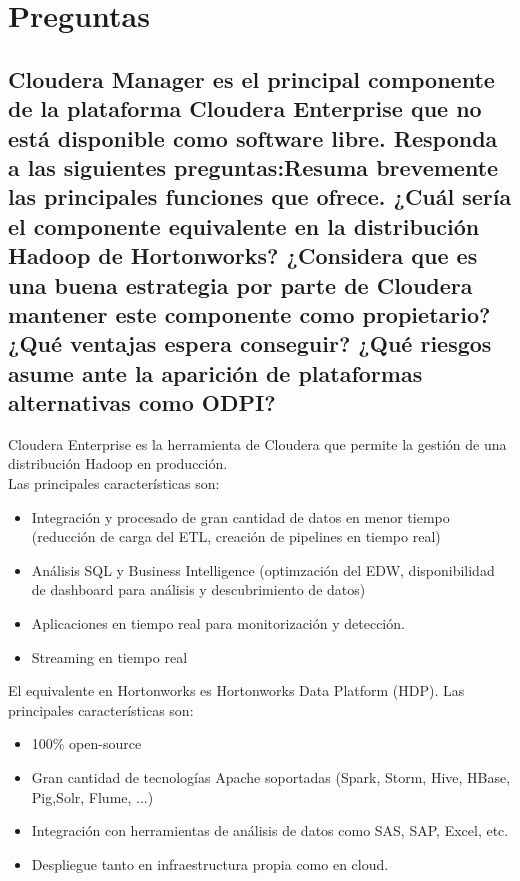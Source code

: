 \documentclass[12pt,a4paper,twoside,openright,titlepage,final]{article}
\author{José Ignacio Escribano}
\title{}
\begin{document}
\setcounter{page}{1}


\tableofcontents
\thispagestyle{empty}
\newpage

\setcounter{page}{1}


\section{Preguntas}

\subsection{Cloudera Manager es el principal componente de la plataforma Cloudera Enterprise que no está disponible como software libre. Responda a las siguientes preguntas:Resuma brevemente las principales funciones que ofrece. ¿Cuál sería el componente equivalente en la distribución Hadoop de Hortonworks? ¿Considera que es una buena estrategia por parte de Cloudera mantener este componente como propietario? ¿Qué ventajas espera conseguir? ¿Qué riesgos asume ante la aparición de plataformas alternativas como ODPI?}

Cloudera Enterprise es la herramienta de Cloudera que permite la gestión de una distribución Hadoop en producción.\\

Las principales características son:

\begin{itemize}
\item Integración y procesado de gran cantidad de datos en menor tiempo (reducción de carga del ETL, creación de pipelines en tiempo real)
\item Análisis SQL y Business Intelligence (optimzación del EDW, disponibilidad de dashboard para análisis y descubrimiento de datos)
\item Aplicaciones en tiempo real para monitorización y detección.
\item Streaming en tiempo real 
\end{itemize}

El equivalente en Hortonworks es Hortonworks Data Platform (HDP). Las principales características son:

\begin{itemize}
\item 100\% open-source
\item Gran cantidad de tecnologías Apache soportadas (Spark, Storm, Hive, HBase, Pig,Solr, Flume, ...)
\item Integración con herramientas de análisis de datos como SAS, SAP, Excel, etc.
\item Despliegue tanto en infraestructura propia como en cloud.
\end{itemize}
\end{document}

